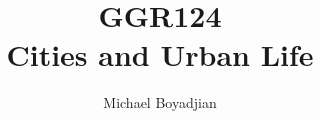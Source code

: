 \documentclass[11pt]{article}
\begin{document}
\title{GGR124 \\ Cities and Urban Life}
\author{Michael Boyadjian}
\maketitle
\pagebreak

\tableofcontents

\pagebreak

\bigskip
\bigskip
\bigskip
\end{document}
